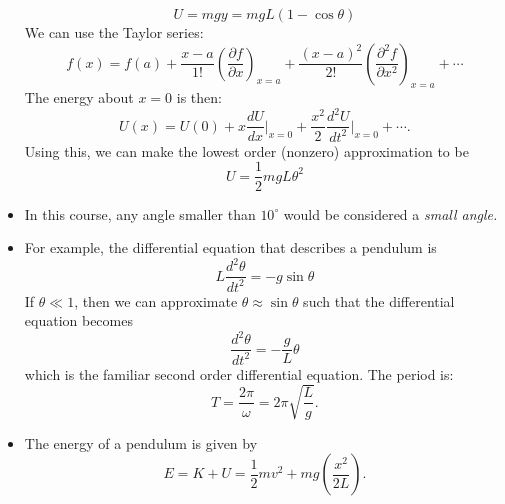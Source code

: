 \begin{itemize}
\begin{example}
\begin{equation}
                U = mgy = mgL(1-\cos\theta)
            \end{equation}
            We can use the Taylor series:
            \begin{equation}
                f(x) = f(a) + \frac{x-a}{1!}\left(\frac{\partial f}{\partial x}\right)_{x=a} + \frac{(x-a)^2}{2!}\left(\frac{\partial^2 f}{\partial x^2}\right)_{x=a} + \cdots
            \end{equation}
            The energy about $x=0$ is then:
            \begin{equation}
                U(x) = U(0) + x\frac{dU}{dx}\bigg\vert_{x=0} + \frac{x^2}{2}\frac{d^2U}{dt^2}\bigg\vert_{x=0} + \cdots.
            \end{equation}
            Using this, we can make the lowest order (nonzero) approximation to be 
            \begin{equation}
                U = \frac{1}{2}mgL \theta^2
            \end{equation} 
        \end{example}
        \item In this course, any angle smaller than $10^\circ$ would be considered a \textit{small angle.}
        \item For example, the differential equation that describes a pendulum is 
        \begin{equation}
            L\frac{d^2\theta}{dt^2}=-g\sin\theta
        \end{equation}
        If $\theta \ll 1$, then we can approximate $\theta \approx \sin\theta$ such that the differential equation becomes 
        \begin{equation}
            \frac{d^2\theta}{dt^2} = -\frac{g}{L}\theta
        \end{equation}
        which is the familiar second order differential equation. The period is:
        \begin{equation}
            T = \frac{2\pi}{\omega} = 2\pi \sqrt{\frac{L}{g}}.
        \end{equation}
        \item The energy of a pendulum is given by
        \begin{equation}
            E = K + U = \frac{1}{2}mv^2 + mg\left(\frac{x^2}{2L}\right).
        \end{equation}
\end{itemize}